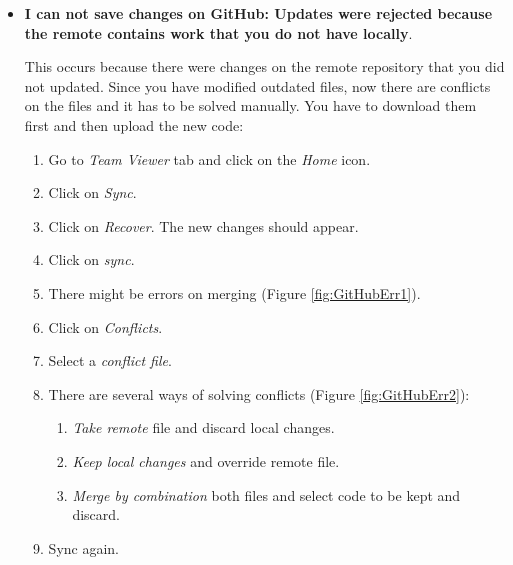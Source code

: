\begin{itemize}
    
	\item \textbf{I can not save changes on GitHub: Updates were rejected because the remote contains work that you do not have locally}.
	
	This occurs because there were changes on the remote repository that you did not updated. Since you have modified outdated files, now there are conflicts on the files and it has to be solved manually. You have to download them first and then upload the new code:
	
	\begin{enumerate}  
		\item Go to \textit{Team Viewer} tab and click on the \textit{Home} icon.
		\item Click on \textit{Sync}.
		\item Click on \textit{Recover}. The new changes should appear.
		\item Click on \textit{sync}.
		\item There might be errors on merging (Figure \ref{fig:GitHubErr1}).
		\item Click on \textit{Conflicts}.
		\item Select a \textit{conflict file}.
		\item There are several ways of solving conflicts (Figure \ref{fig:GitHubErr2}):
		\begin{enumerate}
			\item \textit{Take remote} file and discard local changes.
			\item \textit{Keep local changes} and override remote file.
			\item \textit{Merge by combination} both files and select code to be kept and discard.
		\end{enumerate}
    	\item Sync again.
        

\end{enumerate}
\end{itemize}
